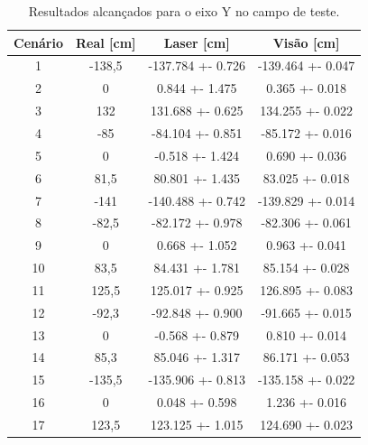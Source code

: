 \documentclass[acronym, symbols, table]{fei}
\begin{document}
				\begin{table}[!htb]
					\centering
					\caption{Resultados alcançados para o eixo Y no campo de teste.}
					\label{tbl:general_results_y}
					\begin{tabular}{|c|
							>{\columncolor[HTML]{A6C9EC}}c |
							>{\columncolor[HTML]{A6C9EC}}c |
							>{\columncolor[HTML]{A6C9EC}}c |}
						\hline
						Cenário                    & Real {[}cm{]}   & Laser {[}cm{]}    & Visão {[}cm{]}    \\ \hline
						\cellcolor[HTML]{FFFFFF}1  & -138,5          & -137.784 +- 0.726 & -139.464 +- 0.047 \\ \hline
						\cellcolor[HTML]{FFFFFF}2  & 0               & 0.844 +- 1.475    & 0.365 +- 0.018    \\ \hline
						\cellcolor[HTML]{FFFFFF}3  & 132             & 131.688 +- 0.625  & 134.255 +- 0.022  \\ \hline
						\cellcolor[HTML]{FFFFFF}4  & -85             & -84.104 +- 0.851  & -85.172 +- 0.016  \\ \hline
						\cellcolor[HTML]{FFFFFF}5  & 0               & -0.518 +- 1.424   & 0.690 +- 0.036    \\ \hline
						\cellcolor[HTML]{FFFFFF}6  & 81,5            & 80.801 +- 1.435   & 83.025 +- 0.018   \\ \hline
						\cellcolor[HTML]{FFFFFF}7  & -141            & -140.488 +- 0.742 & -139.829 +- 0.014 \\ \hline
						\cellcolor[HTML]{FFFFFF}8  & -82,5           & -82.172 +- 0.978  & -82.306 +- 0.061  \\ \hline
						\cellcolor[HTML]{FFFFFF}9  & 0               & 0.668 +- 1.052    & 0.963 +- 0.041    \\ \hline
						\cellcolor[HTML]{FFFFFF}10 & 83,5            & 84.431 +- 1.781   & 85.154 +- 0.028   \\ \hline
						\cellcolor[HTML]{FFFFFF}11 & 125,5           & 125.017 +- 0.925  & 126.895 +- 0.083  \\ \hline
						\cellcolor[HTML]{FFFFFF}12 & -92,3           & -92.848 +- 0.900  & -91.665 +- 0.015  \\ \hline
						\cellcolor[HTML]{FFFFFF}13 & 0               & -0.568 +- 0.879   & 0.810 +- 0.014    \\ \hline
						\cellcolor[HTML]{FFFFFF}14 & 85,3            & 85.046 +- 1.317   & 86.171 +- 0.053   \\ \hline
						\cellcolor[HTML]{FFFFFF}15 & -135,5          & -135.906 +- 0.813 & -135.158 +- 0.022 \\ \hline
						\cellcolor[HTML]{FFFFFF}16 & 0               & 0.048 +- 0.598    & 1.236 +- 0.016    \\ \hline
						\cellcolor[HTML]{FFFFFF}17 & 123,5           & 123.125 +- 1.015  & 124.690 +- 0.023  \\ \hline
					\end{tabular}
				\end{table}
			
\end{document}
